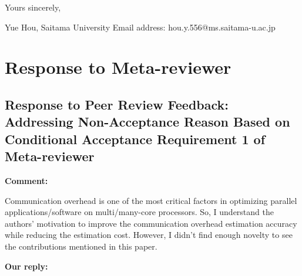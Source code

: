 \documentclass{article}
\begin{document}
\begin{flushleft}
  Yours sincerely,\newline

  Yue Hou,\newline
  Saitama University\newline
  Email address: hou.y.556@ms.saitama-u.ac.jp
\end{flushleft}

\clearpage


\section{Response to Meta-reviewer}
\subsection{Response to Peer Review Feedback: Addressing Non-Acceptance Reason Based on Conditional Acceptance Requirement 1 of Meta-reviewer}

\begin{flushleft}
  \textbf{Comment:}

\end{flushleft}
\begin{adjustwidth}{1cm}{1cm}  %
Communication overhead is one of the most critical factors in optimizing parallel applications/software on multi/many-core processors.
So, I understand the authors' motivation to improve the communication overhead estimation accuracy while reducing the estimation cost.
However, I didn't find enough novelty to see the contributions mentioned in this paper.
\end{adjustwidth}
    
    
\begin{flushleft}
  \textbf{Our reply:}
\end{flushleft}
\end{document}
